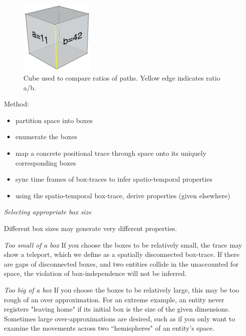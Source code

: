 \begin{figure}
  \centering
  \includegraphics[width=0.32\textwidth]{./figures/counting_cube.png}
  \caption{Cube used to compare ratios of paths.  Yellow edge indicates ratio a/b.}
  \label{fig:unitCubes}
\end{figure}


Method:
\begin{itemize}
 \item partition space into boxes
 \item enumerate the boxes
 \item map a concrete positional trace through space onto its uniquely corresponding boxes
 \item sync time frames of box-traces to infer spatio-temporal properties
 \item using the spatio-temporal box-trace, derive properties (given elsewhere)
\end{itemize}

\emph{Selecting appropriate box size}

Different box sizes may generate very different properties.

\emph{Too small of a box} If you choose the boxes to be relatively small, the trace may show a teleport, which we define as a spatially disconnected box-trace.
If there are gaps of disconnected boxes, and two entities collide in the unaccounted for space, the violation of box-independence will not be inferred.

\emph{Too big of a box} If you choose the boxes to be relatively large, this may be too rough of an over approximation.
For an extreme example, an entity never registers "leaving home" if its initial box is the size of the given dimensions.
Sometimes large over-approximations are desired, such as if you only want to examine the movements across two ``hemispheres" of an entity's space.
